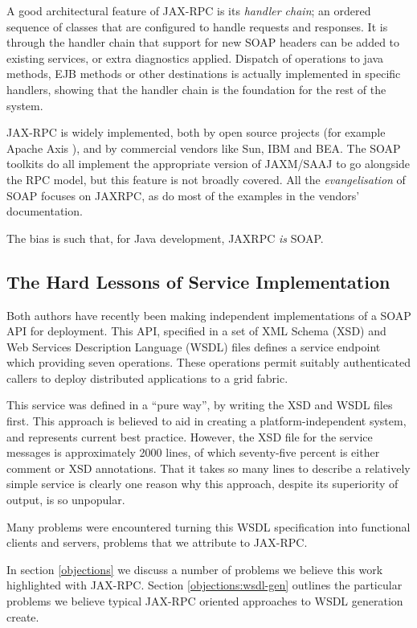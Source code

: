 A good architectural feature of JAX-RPC is its \emph{handler chain}; an
ordered sequence of classes that are configured to handle requests and
responses. It is through the handler chain that support for new SOAP
headers can be added to existing services, or extra diagnostics applied.
Dispatch of operations to java methods, EJB methods or other
destinations is actually implemented in specific handlers, showing that
the handler chain is the foundation for the rest of the system.

JAX-RPC is widely implemented, both by open source projects (for example
Apache Axis \cite{apache:axis}), and by commercial vendors like Sun, IBM
and BEA. The SOAP toolkits do all implement the appropriate version of
JAXM/SAAJ to go alongside the RPC model, but this feature is not broadly
covered. All the \emph{evangelisation} of SOAP focuses on JAXRPC, as do
most of the examples in the vendors' documentation.

The bias is such that, for Java development, JAXRPC \emph{is} SOAP. 

\subsection{The Hard Lessons of Service Implementation}
\label{intro:experience}

Both authors have recently been making independent implementations of
a SOAP API for deployment. This API, specified in a set of XML Schema
(XSD) \cite{spec:XSD} and Web Services Description Language (WSDL)
files \cite{spec:WSDL-11} defines a service endpoint which providing
seven operations. These operations permit suitably authenticated
callers to deploy distributed applications to a grid fabric.

This service was defined in a ``pure way'', by writing the XSD and
WSDL files first. This approach is believed to aid in
creating a platform-independent system, and represents current best
practice. However, the XSD file for the service messages is
approximately 2000 lines, of which seventy-five percent is either
comment or XSD annotations. That it takes so many lines to describe a
relatively simple service is clearly one reason why this approach,
despite its superiority of output, is so unpopular. 

Many problems were encountered turning this WSDL specification into
functional clients and servers, problems that we attribute to JAX-RPC.

In section \ref{objections} we discuss a number of problems we believe
this work highlighted with JAX-RPC. Section \ref{objections:wsdl-gen}
outlines the particular problems we believe typical JAX-RPC oriented
approaches to WSDL generation create.

